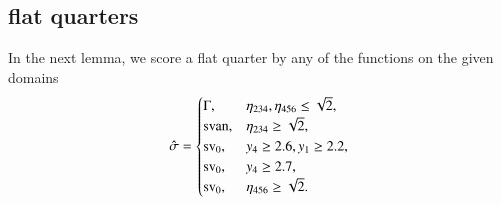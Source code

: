 %
%
%
%
%
%
%
%
%
%
%
%


\subsection{flat quarters} %
    \label{sec:some-flat}




In the next lemma, we score a flat quarter by any of the functions
on the given domains
     $$\hat\sigma=
        \begin{cases}
            \Gamma,& \eta_{234},\eta_{456}\le\sqrt2,\\
             {\operatorname{svan}}, &\eta_{234}\ge\sqrt2,\\
            {\operatorname{sv}}_0, & y_4\ge 2.6, y_1\ge2.2,\\
            {\operatorname{sv}}_0, & y_4\ge 2.7,\\
            {\operatorname{sv}}_0,& \eta_{456}\ge\sqrt2.
        \end{cases}
    $$

